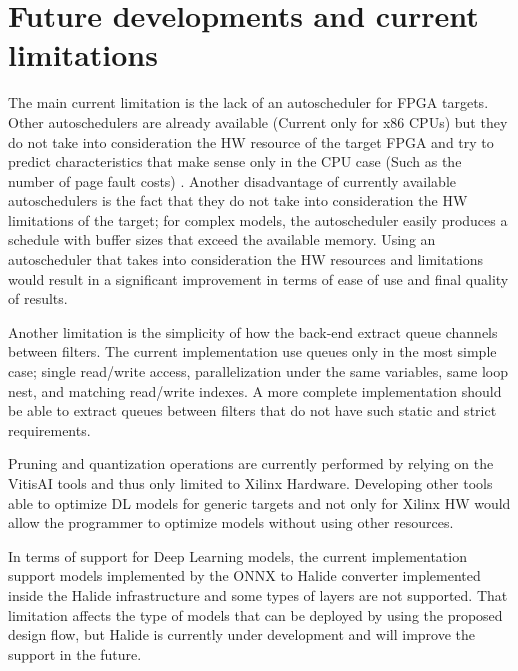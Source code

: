 \documentclass[../main.tex]{subfiles}
\begin{document}
\section{Future developments and current limitations}

The main current limitation is the lack of an autoscheduler for FPGA targets. 
Other autoschedulers are already available (Current only for x86 CPUs) but they do not take into consideration the HW resource of the target FPGA and try to predict characteristics that make sense only in the CPU case (Such as the number of page fault costs) \cite{halideAutoscheduler}.
Another disadvantage of currently available autoschedulers is the fact that they do not take into consideration the HW limitations of the target; for complex models, the autoscheduler easily produces a schedule with buffer sizes that exceed the available memory.
Using an autoscheduler that takes into consideration the HW resources and limitations would result in a significant improvement in terms of ease of use and final quality of results.

Another limitation is the simplicity of how the back-end extract queue channels between filters.
The current implementation use queues only in the most simple case; single read/write access, parallelization under the same variables, same loop nest, and matching read/write indexes.
A more complete implementation should be able to extract queues between filters that do not have such static and strict requirements.

Pruning and quantization operations are currently performed by relying on the VitisAI tools and thus only limited to Xilinx Hardware.
Developing other tools able to optimize DL models for generic targets and not only for Xilinx HW would allow the programmer to optimize models without using other resources.

In terms of support for Deep Learning models, the current implementation support models implemented by the ONNX to Halide converter implemented inside the Halide infrastructure and some types of layers are not supported.
That limitation affects the type of models that can be deployed by using the proposed design flow, but Halide is currently under development and will improve the support in the future.
\end{document}
